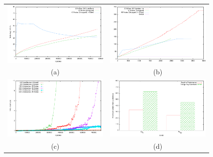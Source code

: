 \begin{figure}[t!]
\begin{center}
\begin{tabular}{cc}
\includegraphics[width=3.0in]{images/100mbUpdatesVsCPUCompletion.pdf} & \includegraphics[width=3.0in]{images/100mbUpdatesVsMemory.pdf}\\
(a) & (b) \\
\includegraphics[width=3.0in]{images/expandingbreakdown.pdf} & \includegraphics[width=3.0in]{images/foreignkey.pdf}\\
(c) & (d) \\

\end{tabular}
\end{center}
\end{figure}
